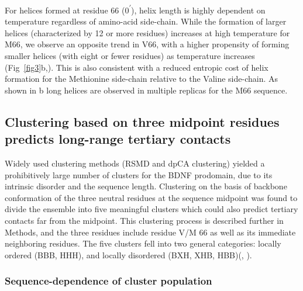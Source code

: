 \documentclass[10pt,letterpaper]{article}
\begin{document}
For helices formed at residue 66 (0\textsuperscript{$\prime$}), helix length is highly dependent on temperature regardless of amino-acid side-chain.
While the formation of larger helices (characterized by 12 or more residues) increases at high temperature for M66, we observe an opposite trend in V66, with a higher propensity of forming smaller helices (with eight or fewer residues) as temperature increases (Fig~\ref{fig3}b,).  This is also consistent with a reduced entropic cost of helix formation for the Methionine side-chain relative to the Valine side-chain.  As shown in b long helices are observed in multiple replicas for the M66 sequence.  




\subsection*{Clustering based on three midpoint residues predicts long-range tertiary contacts}

Widely used clustering methods (RSMD and dpCA clustering) yielded a prohibitively large number of clusters for the BDNF prodomain, due to its intrinsic disorder and the sequence length.  Clustering on the basis of backbone conformation of the three neutral residues at the sequence midpoint was found to divide the ensemble into five meaningful clusters which could also predict tertiary contacts far from the midpoint. This clustering process is described further in Methods, and the three residues include residue V/M 66 as well as its immediate neighboring residues. The five clusters fell into two general categories: locally ordered (BBB, HHH), and locally disordered (BXH, XHB, HBB)(, ).

\subsubsection*{Sequence-dependence of cluster population} 
\end{document}
